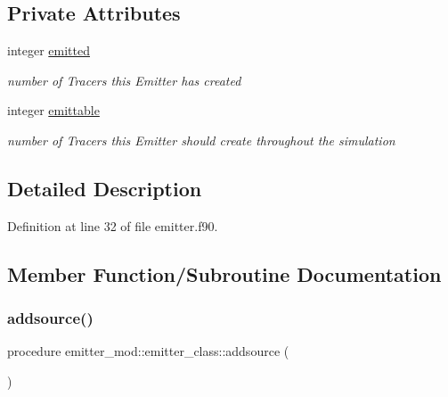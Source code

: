 \subsection*{Private Attributes}
\begin{DoxyCompactItemize}
\item 
integer \mbox{\hyperlink{structemitter__mod_1_1emitter__class_aa8f56d34f32e452a2e78f93f44780b4b}{emitted}}
\begin{DoxyCompactList}\small\item\em number of Tracers this Emitter has created \end{DoxyCompactList}\item 
integer \mbox{\hyperlink{structemitter__mod_1_1emitter__class_a201a8b070193b7217c5a5c8973d76cd6}{emittable}}
\begin{DoxyCompactList}\small\item\em number of Tracers this Emitter should create throughout the simulation \end{DoxyCompactList}\end{DoxyCompactItemize}


\subsection{Detailed Description}


Definition at line 32 of file emitter.\+f90.



\subsection{Member Function/\+Subroutine Documentation}
\mbox{\label{structemitter__mod_1_1emitter__class_a162685b7b0bf96b555fee37e129c9783}} 
\subsubsection{\texorpdfstring{addsource()}{addsource()}}
{\footnotesize\ttfamily procedure emitter\+\_\+mod\+::emitter\+\_\+class\+::addsource (\begin{DoxyParamCaption}{ }\end{DoxyParamCaption})\hspace{0.3cm}{\ttfamily [private]}}



